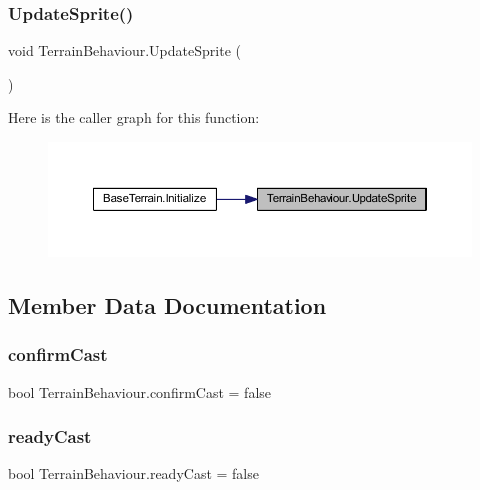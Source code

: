 \subsubsection{\texorpdfstring{UpdateSprite()}{UpdateSprite()}}
{\footnotesize\ttfamily void Terrain\+Behaviour.\+Update\+Sprite (\begin{DoxyParamCaption}{ }\end{DoxyParamCaption})}

Here is the caller graph for this function\+:
\nopagebreak
\begin{figure}[H]
\begin{center}
\leavevmode
\includegraphics[width=350pt]{class_terrain_behaviour_a1f1234296c90b45abf0ad3ee6f9e78ac_icgraph}
\end{center}
\end{figure}


\subsection{Member Data Documentation}
\mbox{\label{class_terrain_behaviour_a36547c4343110b97274e7c3c8d3b5ff2}} 
\subsubsection{\texorpdfstring{confirmCast}{confirmCast}}
{\footnotesize\ttfamily bool Terrain\+Behaviour.\+confirm\+Cast = false}

\mbox{\label{class_terrain_behaviour_a31d1471342a45dcdc36a0c0f78680d0f}} 
\subsubsection{\texorpdfstring{readyCast}{readyCast}}
{\footnotesize\ttfamily bool Terrain\+Behaviour.\+ready\+Cast = false}

